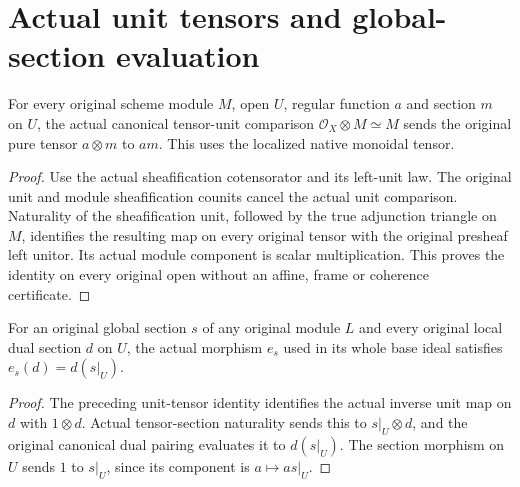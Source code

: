 \section{Actual unit tensors and global-section evaluation}

\begin{lemma}
\label{lem:actual-scheme-left-unit-tensor-section}
For every original scheme module $M$, open $U$, regular function $a$
and section $m$ on $U$, the actual canonical tensor-unit comparison
$\mathcal O_X\otimes M\simeq M$ sends the original pure tensor
$a\otimes m$ to $am$. This uses the localized native monoidal tensor.
\leanok
\end{lemma}
\begin{proof}
Use the actual sheafification cotensorator and its left-unit law.
The original unit and module sheafification counits cancel the actual
unit comparison. Naturality of the sheafification unit, followed by
the true adjunction triangle on $M$, identifies the resulting map on
every original tensor with the original presheaf left unitor.
Its actual module component is scalar multiplication. This proves the
identity on every original open without an affine, frame or coherence
certificate.
\end{proof}

\begin{proposition}
\label{prop:actual-line-global-section-evaluation}
For an original global section $s$ of any original module $L$ and every
original local dual section $d$ on $U$, the actual morphism $e_s$ used
in its whole base ideal satisfies $e_s(d)=d(s|_U)$.
\leanok
\end{proposition}
\begin{proof}
The preceding unit-tensor identity identifies the actual inverse unit
map on $d$ with $1\otimes d$. Actual tensor-section naturality sends
this to $s|_U\otimes d$, and the original canonical dual pairing
evaluates it to $d(s|_U)$. The section morphism on $U$ sends $1$ to
$s|_U$, since its component is $a\mapsto as|_U$.
\end{proof}

